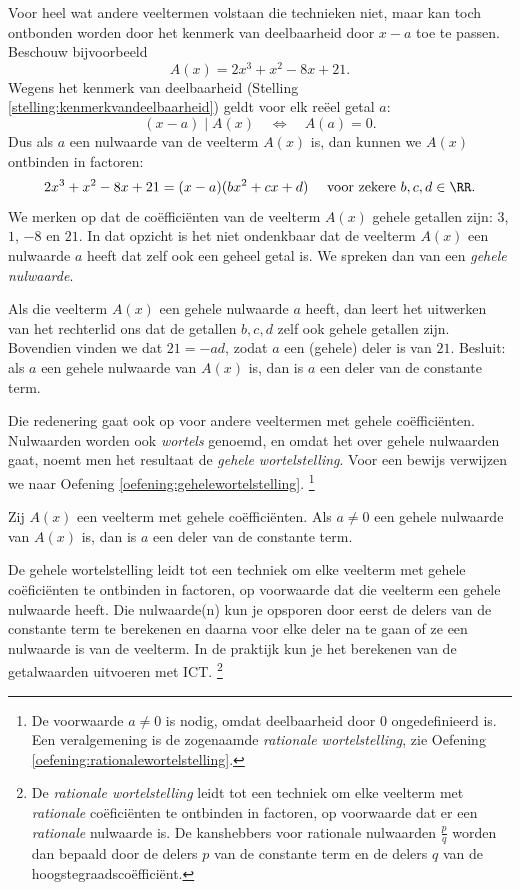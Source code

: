 \documentclass{ximera}
\begin{document}
Voor heel wat andere veeltermen volstaan die technieken niet, maar kan toch ontbonden worden door het kenmerk van deelbaarheid door $x-a$ toe te passen. Beschouw bijvoorbeeld
\[
A(x) = 2x^3 +x^2 - 8x + 21.
\]
Wegens het kenmerk van deelbaarheid (Stelling \ref{stelling:kenmerkvandeelbaarheid}) geldt voor elk re\"eel getal $a$: 
\[
(x-a) \mid A(x) \quad \Leftrightarrow \quad A(a) = 0. 
\]
Dus als $a$ een nulwaarde van de veelterm $A(x)$ is, dan kunnen we $A(x)$ ontbinden in factoren:
\[
2x^3 +x^2 - 8x + 21 = (x-a)(bx^2 + cx + d) %
\quad 
\text{ voor zekere } b,c,d \in \RR.
\]
We merken op dat de co\"effici\"enten van de veelterm $A(x)$ gehele getallen zijn: $3$, $1$, $-8$ en $21$. In dat opzicht is het niet ondenkbaar dat de veelterm $A(x)$ een nulwaarde $a$ heeft dat zelf ook een geheel getal is. We spreken dan van een {\em gehele nulwaarde}.

Als die veelterm $A(x)$ een gehele nulwaarde $a$ heeft, dan leert het uitwerken van het rechterlid ons dat de getallen $b,c,d$ zelf ook gehele getallen zijn. Bovendien vinden we dat $21 = -ad$, zodat $a$ een (gehele) deler is van $21$. Besluit: als $a$ een gehele nulwaarde van $A(x)$ is, dan is $a$ een deler van de constante term. 

Die redenering gaat ook op voor andere veeltermen met gehele co\"effici\"enten. Nulwaarden worden ook {\em wortels} genoemd, en omdat het over gehele nulwaarden gaat, noemt men het resultaat de {\em gehele wortelstelling}. Voor een bewijs verwijzen we naar Oefening \ref{oefening:gehelewortelstelling}.
\footnote{De voorwaarde $a \neq 0$ is nodig, omdat deelbaarheid door $0$ ongedefinieerd is.
Een veralgemening is de zogenaamde {\em rationale wortelstelling}, zie Oefening \ref{oefening:rationalewortelstelling}.}

\begin{stelling} \label{stelling:gehelewortelstelling}
Zij $A(x)$ een veelterm met gehele co\"effici\"enten. Als $a \neq 0$ een gehele nulwaarde van $A(x)$ is, dan is $a$ een deler van de constante term. 
\end{stelling}





De gehele wortelstelling leidt tot een techniek om elke veelterm met gehele co\"efici\"enten te ontbinden in factoren, op voorwaarde dat die veelterm een gehele nulwaarde heeft. Die nulwaarde(n) kun je opsporen door eerst de delers van de constante term te berekenen en daarna voor elke deler na te gaan of ze een nulwaarde is van de veelterm. In de praktijk kun je het berekenen van de getalwaarden uitvoeren met ICT. \footnote{De {\em rationale wortelstelling} leidt tot een techniek om elke veelterm met {\em rationale} co\"efici\"enten 
te ontbinden in factoren, op voorwaarde dat er een {\em rationale} nulwaarde is. De kanshebbers voor rationale nulwaarden $\frac{p}{q}$ worden dan bepaald door de delers $p$ van de constante term en de delers $q$ van de hoogstegraadsco\"effici\"ent.}
\end{document}

